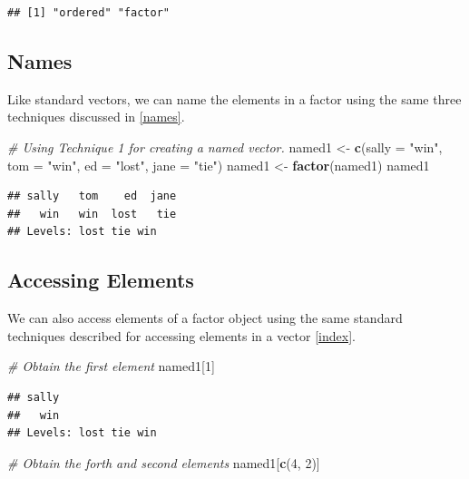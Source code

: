 \documentclass[
]{book}
\newenvironment{Shaded}{\begin{snugshade}}{\end{snugshade}}
\newcommand{\CommentTok}[1]{\textcolor[rgb]{0.56,0.35,0.01}{\textit{#1}}}
\newcommand{\DataTypeTok}[1]{\textcolor[rgb]{0.13,0.29,0.53}{#1}}
\newcommand{\DecValTok}[1]{\textcolor[rgb]{0.00,0.00,0.81}{#1}}
\newcommand{\KeywordTok}[1]{\textcolor[rgb]{0.13,0.29,0.53}{\textbf{#1}}}
\newcommand{\NormalTok}[1]{#1}
\newcommand{\StringTok}[1]{\textcolor[rgb]{0.31,0.60,0.02}{#1}}
\begin{document}
\begin{verbatim}
## [1] "ordered" "factor"
\end{verbatim}

\hypertarget{names-1}{%
\subsection{Names}\label{names-1}}

Like standard vectors, we can name the elements in a factor using the same three techniques discussed in \ref{names}.

\begin{Shaded}
\begin{Highlighting}[]
\CommentTok{# Using Technique 1 for creating a named vector.}
\NormalTok{named1 <-}\StringTok{ }\KeywordTok{c}\NormalTok{(}\DataTypeTok{sally =} \StringTok{"win"}\NormalTok{, }\DataTypeTok{tom =} \StringTok{"win"}\NormalTok{, }\DataTypeTok{ed =} \StringTok{"lost"}\NormalTok{, }\DataTypeTok{jane =} \StringTok{"tie"}\NormalTok{)}
\NormalTok{named1 <-}\StringTok{ }\KeywordTok{factor}\NormalTok{(named1)}
\NormalTok{named1}
\end{Highlighting}
\end{Shaded}

\begin{verbatim}
## sally   tom    ed  jane 
##   win   win  lost   tie 
## Levels: lost tie win
\end{verbatim}

\hypertarget{accessing-elements}{%
\subsection{Accessing Elements}\label{accessing-elements}}

We can also access elements of a factor object using the same standard techniques described for accessing elements in a vector \ref{index}.

\begin{Shaded}
\begin{Highlighting}[]
\CommentTok{# Obtain the first element}
\NormalTok{named1[}\DecValTok{1}\NormalTok{]}
\end{Highlighting}
\end{Shaded}

\begin{verbatim}
## sally 
##   win 
## Levels: lost tie win
\end{verbatim}

\begin{Shaded}
\begin{Highlighting}[]
\CommentTok{# Obtain the forth and second elements}
\NormalTok{named1[}\KeywordTok{c}\NormalTok{(}\DecValTok{4}\NormalTok{, }\DecValTok{2}\NormalTok{)]}
\end{Highlighting}
\end{Shaded}
\end{document}
